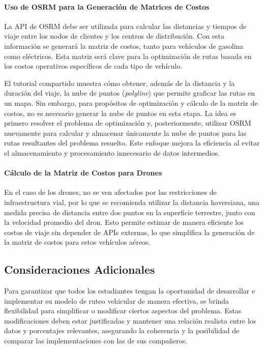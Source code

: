 \documentclass[12pt]{article}
\begin{document}
\paragraph{Uso de OSRM para la Generación de Matrices de Costos}
La API de OSRM debe ser utilizada para calcular las distancias y tiempos de viaje entre los nodos de clientes y los centros de distribución. Con esta información se generará la matriz de costos, tanto para vehículos de gasolina como eléctricos. Esta matriz será clave para la optimización de rutas basada en los costos operativos específicos de cada tipo de vehículo.

El tutorial compartido muestra cómo obtener, además de la distancia y la duración del viaje, la nube de puntos (\textit{polyline}) que permite graficar las rutas en un mapa. Sin embargo, para propósitos de optimización y cálculo de la matriz de costos, no es necesario generar la nube de puntos en esta etapa. La idea es primero resolver el problema de optimización y, posteriormente, utilizar OSRM nuevamente para calcular y almacenar únicamente la nube de puntos para las rutas resultantes del problema resuelto. Este enfoque mejora la eficiencia al evitar el almacenamiento y procesamiento innecesario de datos intermedios.

\paragraph{Cálculo de la Matriz de Costos para Drones}
En el caso de los drones, no se ven afectados por las restricciones de infraestructura vial, por lo que se recomienda utilizar la distancia haversiana, una medida precisa de distancia entre dos puntos en la superficie terrestre, junto con la velocidad promedio del dron. Esto permite estimar de manera eficiente los costos de viaje sin depender de APIs externas, lo que simplifica la generación de la matriz de costos para estos vehículos aéreos.

\subsection{Consideraciones Adicionales}

Para garantizar que todos los estudiantes tengan la oportunidad de desarrollar e implementar su modelo de ruteo vehicular de manera efectiva, se brinda flexibilidad para simplificar o modificar ciertos aspectos del problema. Estas modificaciones deben estar justificadas y mantener una relación realista entre los datos y porcentajes relevantes, asegurando la coherencia y la posibilidad de comparar las implementaciones con las de sus compañeros.
\end{document}
